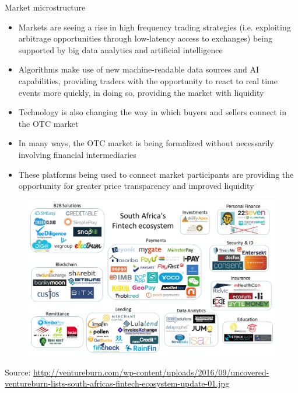 \documentclass[10pt]{beamer}
\begin{document}

\begin{frame}{Market microstructure}
	\begin{itemize}
		\item Markets are seeing a rise in high frequency trading strategies (i.e. exploiting arbitrage opportunities through low-latency access to exchanges) being supported by big data analytics and artificial intelligence
		\item Algorithms make use of new machine-readable data sources and AI capabilities, providing traders with the opportunity to react to real time events more quickly, in doing so, providing the market with liquidity
		\item Technology is also changing the way in which buyers and sellers connect in the OTC market
		\item In many ways, the OTC market is being formalized without necessarily involving financial intermediaries
		\item These platforms being used to connect market participants are providing the opportunity for greater price transparency and improved liquidity
	\end{itemize}
\end{frame}


\begin{frame}
	\begin{figure}[]
		\centering
		\includegraphics  [scale=0.2]{Images/ecosystem}
	\end{figure}
	\begin{tiny}
		Source: \href{http://ventureburn.com/2016/09/uncovered-ventureburn-lists-south-africas-fintech-ecosystem/}{http://ventureburn.com/wp-content/uploads/2016/09/uncovered-ventureburn-lists-south-africas-fintech-ecosystem-update-01.jpg}
	\end{tiny}
\end{frame}
\end{document}
